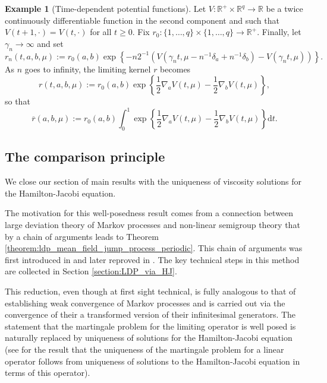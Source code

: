 \documentclass[a4paper]{article}
\newcommand{\bR}{\mathbb{R}}
\newcommand{\dd}{ \mathrm{d}}
\numberwithin{equation}{section}
\theoremstyle{definition}
\newtheorem{example}[theorem]{Example}
\begin{document}
\begin{example}[Time-dependent potential functions] \label{example:Gibbs_dynamics}
	Let $V : \bR^+ \times \bR^q \rightarrow \bR$ be a twice continuously differentiable function in the second component and such that $V(t +1, \cdot) = V(t,\cdot)$ for all $t \geq 0$. Fix $r_0 : \{1,\dots,q\}\times\{1,\dots,q\} \rightarrow \bR^+$. Finally, let $\gamma_n \rightarrow \infty$ and set
	\begin{equation*}
		r_n(t,a,b,\mu) := r_0(a,b)\exp\left\{- n 2^{-1}\left(V\left(\gamma_n t, \mu - n^{-1}\delta_a + n^{-1} \delta_b\right) - V(\gamma_n t,\mu)\right) \right\}.
	\end{equation*}
	As $n$ goes to infinity, the limiting kernel $r$ becomes
	\begin{equation*}
		r(t,a,b,\mu) := r_0(a,b) \exp\left\{\frac{1}{2} \nabla_a V(t,\mu) - \frac{1}{2} \nabla_b V(t,\mu) \right\},
	\end{equation*}
	so that
	\begin{equation*}
		\overline{r}(a,b,\mu) :=  r_0(a,b) \int_0^1 \exp\left\{\frac{1}{2} \nabla_a V(t,\mu) - \frac{1}{2} \nabla_b V(t,\mu) \right\} \dd t.
	\end{equation*}
\end{example}


\subsection{The comparison principle} \label{section:comparison_principle}


We close our section of main results with the uniqueness of viscosity solutions  for the Hamilton-Jacobi equation.

The motivation for this well-posedness result comes from a connection between large deviation theory of Markov processes and non-linear semigroup theory that by a chain of arguments leads to Theorem  \ref{theorem:ldp_mean_field_jump_process_periodic}. This chain of arguments was first introduced in \cite{FK06} and later reproved in \cite{Kr19,Kr19c}. The key technical steps in this method are collected in Section \ref{section:LDP_via_HJ}.

This reduction, even though at first sight technical, is fully analogous to that of establishing weak convergence of Markov processes and is carried out via the convergence of their a transformed version of their infinitesimal generators. The statement that the martingale problem for the limiting operator is well posed is naturally replaced by uniqueness of solutions for the Hamilton-Jacobi equation (see \cite{CoKu15} for the result that the uniqueness of the martingale problem for a linear operator follows from uniqueness of solutions to the Hamilton-Jacobi equation in terms of this operator). 
\end{document}

